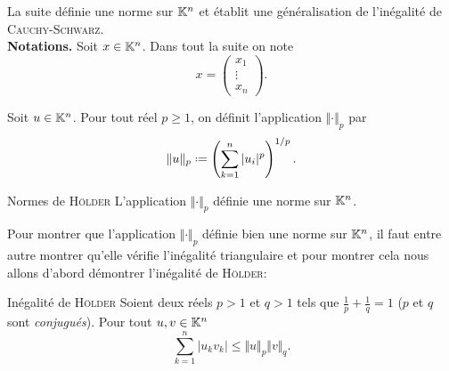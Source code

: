 La suite définie une norme sur $\mathbb{K}^n$ et établit une généralisation de l'inégalité de \textsc{Cauchy}-\textsc{Schwarz}. \\
\textbf{Notations.} Soit $x \in \mathbb{K}^n$. Dans tout la suite on note
$$
x = 
\begin{pmatrix}
    x_1 \\
    \vdots \\
    x_n
\end{pmatrix}.
$$
\begin{defi}{}
    Soit $u \in \mathbb{K}^n$. Pour tout réel $p \geqslant 1$, on définit l'application $\Vert \bm{\cdot} \Vert_p$ par
    $$\Vert u \Vert_p \defeq \left (\sum_{k=1}^{n} |u_i|^p \right)^{1/p}.$$
\end{defi}


\begin{prop}{Normes de \textsc{Hölder}}
    L'application $\Vert \bm{\cdot} \Vert_p$ définie une norme sur $\mathbb{K}^n$.
\end{prop}

Pour montrer que l'application $\Vert \bm{\cdot} \Vert_p$ définie bien une norme sur $\mathbb{K}^n$, il faut entre autre montrer qu'elle vérifie l'inégalité triangulaire et pour montrer cela nous allons d'abord démontrer l'inégalité de \textsc{Hölder}:

\begin{prop}{Inégalité de \textsc{Hölder}}
    Soient deux réels $p > 1$ et $q > 1$ tels que $\frac{1}{p} + \frac{1}{q} = 1$ ($p$ et $q$ sont \emph{conjugués}). Pour tout $u, v \in \mathbb{K}^n$
    $$\sum_{k=1}^{n} |u_k v_k| \leqslant \Vert u \Vert_p \Vert v \Vert_q.$$
\end{prop}

%    

